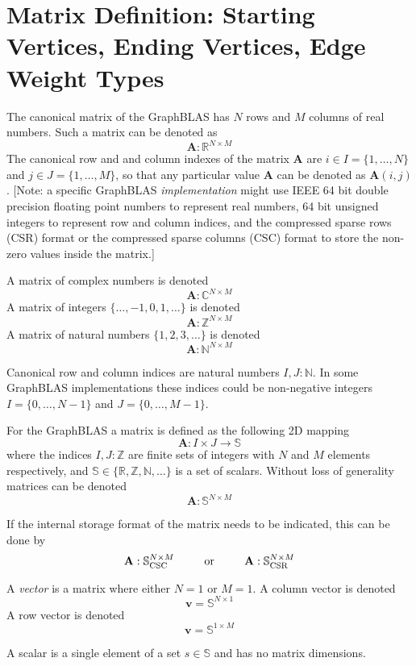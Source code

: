 \section{Matrix Definition: Starting Vertices, Ending Vertices, Edge Weight Types}
  The canonical matrix of the GraphBLAS has $N$ rows and $M$ columns of real numbers.  Such a matrix can be denoted as
$$
  \mathbf{A}: \mathbb{R}^{N \times M}
$$
The canonical row and and column indexes of the matrix $\mathbf{A}$ are $i \in I = \{1,\ldots,N\}$ and $j \in J = \{1,\ldots,M\}$, so that any particular value $\mathbf{A}$ can be denoted as $\mathbf{A}(i,j)$.  [Note: a specific GraphBLAS \emph{implementation} might use IEEE 64 bit double precision floating point numbers to represent real numbers, 64 bit unsigned integers to represent row and column indices, and the compressed sparse rows (CSR) format or the compressed sparse columns (CSC) format to store the non-zero values inside the matrix.]

  A matrix of complex numbers is denoted
$$
  \mathbf{A}: \mathbb{C}^{N \times M}
$$
  A matrix of integers $\{\ldots, -1, 0, 1, \ldots\}$ is denoted
$$
  \mathbf{A}: \mathbb{Z}^{N \times M}
$$
  A matrix of natural numbers $\{1, 2, 3, \ldots\}$ is denoted
$$
  \mathbf{A}: \mathbb{N}^{N \times M}
$$

  Canonical row and column indices are natural numbers $I,J : \mathbb{N}$.  In some GraphBLAS implementations these indices could be non-negative integers  $I = \{0,\ldots,N-1\}$ and $J = \{0,\ldots,M-1\}$.
  
  For the GraphBLAS a matrix is defined as the following 2D mapping
$$
  \mathbf{A} : I \times J \rightarrow \mathbb{S}
$$
where the indices $I, J : \mathbb{Z}$ are finite sets of integers with $N$ and $M$ elements respectively, and  $\mathbb{S} \in \{\mathbb{R},\mathbb{Z},\mathbb{N}, \ldots \}$ is a set of scalars.  Without loss of generality matrices can be denoted
$$
  \mathbf{A}: \mathbb{S}^{N \times M}
$$

If the internal storage format of the matrix needs to be indicated, this can be done by
$$
  \mathbf{A}: \mathbb{S}^{N \times M}_{\rm CSC}  ~~~~~~~~ {\rm or}  ~~~~~~~~ 
  \mathbf{A}: \mathbb{S}^{N \times M}_{\rm CSR}
$$

  A \emph{vector} is a matrix where either $N=1$ or $M=1$. A column vector is denoted
$$
 \mathbf{v} = \mathbb{S}^{N \times 1}
$$
  A row vector is denoted
$$
  \mathbf{v} = \mathbb{S}^{1 \times M}
$$

  A scalar is a single element of a set $s \in \mathbb{S}$ and has no matrix dimensions.

